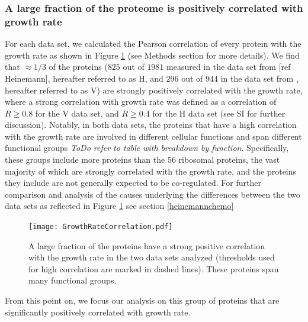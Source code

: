 \documentclass[notitlepage]{article}
\begin{document}
\subsubsection{A large fraction of the proteome is positively correlated with growth rate}
For each data set, we calculated the Pearson correlation of every protein with the growth rate as shown in Figure \ref{fig:growthcorr} (see Methods section for more details).
We find that $\approx 1/3$ of the proteins ($825$ out of $1981$ measured in the data set from [ref Heinemann], hereafter referred to as H, and $296$ out of $944$ in the data set from \parencite{Valgepea2013}, hereafter referred to as V) are strongly positively correlated with the growth rate, where a strong correlation with growth rate was defined as a correlation of $R\geq 0.8$ for the V data set, and $R\geq 0.4$ for the H data set (see SI for further discussion).
Notably, in both data sets, the proteins that have a high correlation with the growth rate are involved in different cellular functions and span different functional groups \emph{ToDo refer to table with breakdown by function}.
Specifically, these groups include more proteins than the 56 ribosomal proteins, the vast majority of which are strongly correlated with the growth rate, and the proteins they include are not generally expected to be co-regulated.
For further comparison and analysis of the causes underlying the differences between the two data sets as reflected in Figure \ref{fig:growthcorr} see section \ref{heinemannchemo}

\begin{figure}[h]
\centering
\texttt{[image: GrowthRateCorrelation.pdf]}
\caption{
A large fraction of the proteins have a strong positive correlation with the growth rate in the two data sets analyzed (thresholds used for high correlation are marked in dashed lines).
These proteins span many functional groups.
}
\label{fig:growthcorr}
\end{figure}
From this point on, we focus our analysis on this group of proteins that are significantly positively correlated with growth rate.
\end{document}
